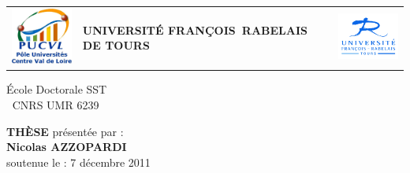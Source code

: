 \thispagestyle{empty}

\setmarginsrb{25mm}{0mm}{20mm}{0mm}{0mm}{0mm}{0mm}{0mm}

\begin{tabular}{ p{3cm} p{9cm} p{3cm}}
	\begin{minipage}{3cm}
		\includegraphics[width=2.99cm]{./images/pucvl.png} 
	\end{minipage}
	&
	\begin{minipage}{9cm}
		\begin{center}
			\textbf{\LARGE{UNIVERSITÉ FRANÇOIS~RABELAIS DE TOURS}}
		\end{center}
	\end{minipage}
	&
	\begin{minipage}{3cm}
		\includegraphics[width=2.99cm]{./images/ufr.png} 
	\end{minipage}
\end{tabular}
	
\vspace{1cm}
	
\begin{minipage}{16cm}
	\begin{center}
		École Doctorale SST \\ \vspace{0.2cm}
		$\ $ CNRS UMR 6239
	\end{center}
\end{minipage}
	
\vspace{.5cm}
	
\begin{minipage}{16cm}
	\begin{center}
		\LARGE \textbf{THÈSE} \normalsize présentée par : \\ \vspace{0.2cm}
		\large \textbf{Nicolas AZZOPARDI}\\ \vspace{0.2cm}
		soutenue le : 7 décembre 2011
	\end{center}
\end{minipage}
	
